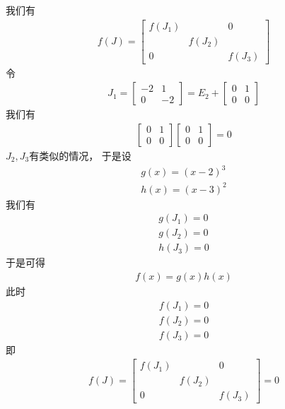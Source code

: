 \documentclass{article}
\begin{document}
我们有
\begin{align*}
  f(J) = \begin{bmatrix}
           f(J_1) &        & 0      \\
                  & f(J_2) &        \\
           0      &        & f(J_3)
         \end{bmatrix}
\end{align*}
令
\begin{align*}
  J_1 = \begin{bmatrix}
          -2 & 1  \\
          0  & -2
        \end{bmatrix}
  = E_2 + \begin{bmatrix}
            0 & 1 \\
            0 & 0
          \end{bmatrix}
\end{align*}
我们有
\begin{align*}
  \begin{bmatrix}
    0 & 1 \\
    0 & 0
  \end{bmatrix} \begin{bmatrix}
                  0 & 1 \\
                  0 & 0
                \end{bmatrix} = 0
\end{align*}
$J_2, J_3$有类似的情况，
于是设
\begin{align*}
  g(x) = (x - 2)^3 \\
  h(x) = (x - 3)^2
\end{align*}
我们有
\begin{align*}
  g(J_1) = 0 \\
  g(J_2) = 0 \\
  h(J_3) = 0
\end{align*}
于是可得
\begin{align*}
  f(x) = g(x) h(x)
\end{align*}
此时
\begin{align*}
  f(J_1) = 0 \\
  f(J_2) = 0 \\
  f(J_3) = 0
\end{align*}
即
\begin{align*}
  f(J) = \begin{bmatrix}
           f(J_1) &        & 0      \\
                  & f(J_2) &        \\
           0      &        & f(J_3)
         \end{bmatrix}
  = 0
\end{align*}
\end{document}
